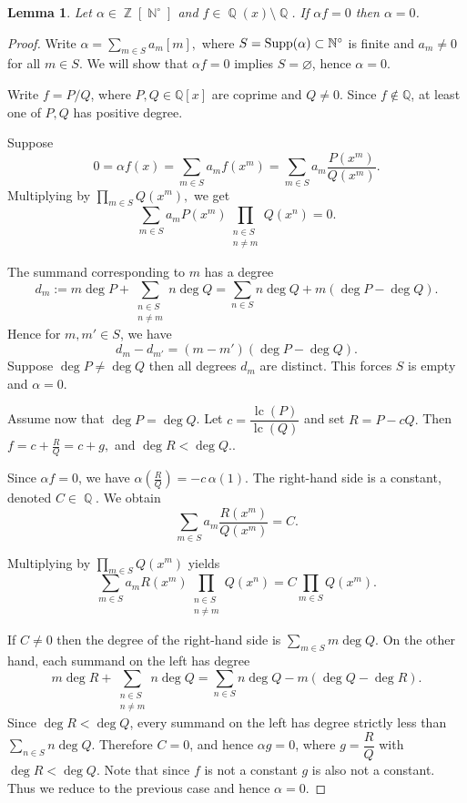 \documentclass[12t,a4paper]{amsart}
\newtheorem{lem}[thm]{Lemma}
\theoremstyle{definition}
\DeclareMathOperator{\Z}{\mathbb{Z}}
\DeclareMathOperator{\N}{\mathbb{N}}
\DeclareMathOperator{\Q}{\mathbb{Q}}
\DeclareMathOperator{\supp}{{\rm Supp}}
\numberwithin{equation}{section}
\begin{document}
{\begin{lem} Let $\alpha\in \Z[\N^\circ]$ and $f\in \Q(x)\setminus \Q$. If $\alpha f=0$ then  $\alpha=0$.
    
\end{lem}
\begin{proof}
 Write
\( 
\alpha=\sum_{m\in S} a_m[m],
\)
where \(S=\supp(\alpha)\subset \mathbb N^\circ\) is finite and \(a_m\neq 0\) for all \(m\in S\).
We will show that \(\alpha f=0\) implies \(S=\varnothing\), hence \(\alpha=0\).

Write \(f=P/Q\), where \(P,Q\in \mathbb Q[x]\) are coprime and \(Q\neq 0\). Since \(f\notin \mathbb Q\), at least one of \(P,Q\) has positive degree. 

Suppose
\[
0=\alpha f(x)=\sum_{m\in S} a_m f(x^m)=\sum_{m\in S} a_m \frac{P(x^m)}{Q(x^m)}.
\]
Multiplying by
\( 
\prod\limits_{m\in S} Q(x^m),
\)
we get
\[
\sum_{m\in S}
a_m P(x^m)\prod_{\substack{n\in S\\ n\neq m}} Q(x^n)=0.
\]

 The summand corresponding to  \(m\) has a degree
\[
d_m:=m\deg P+\sum_{\substack{n\in S\\ n\neq m}} n\deg Q =\sum_{n\in S} n\deg Q + m(\deg P-\deg Q).
\]
Hence for $m,m'\in S$, we have
\[
d_m-d_{m'}=(m-m')(\deg P-\deg Q). 
\]
Suppose $\deg P\not=\deg Q$ then all  degrees $d_m$ are distinct. This forces $S$ is empty and $\alpha=0$.

 Assume now that \(\deg P=\deg Q\). Let
\(
c=\dfrac{\operatorname{lc}(P)}{\operatorname{lc}(Q)}
\)
and set
\(
R=P-cQ.
\) 
Then
\(
f=c+\frac{R}{Q}=c+g,
\)
and
\(
\deg R<\deg Q.
\).

Since \(\alpha f=0\), we have
\( 
\alpha\!\left(\frac{R}{Q}\right)
=
-c\,\alpha(1).
\)
The right-hand side is a constant, denoted $C\in \Q$. We obtain
\[
\sum_{m\in S} a_m \frac{R(x^m)}{Q(x^m)}=C.
\]


Multiplying by \(\prod_{m\in S}Q(x^m)\) yields
\[
\sum_{m\in S}
a_m R(x^m)
\prod_{\substack{n\in S\\ n\neq m}}
Q(x^n)
=
C\prod_{m\in S}Q(x^m).
\]

If $C\not=0$ then the degree of the right-hand side is
\(
\sum\limits_{m\in S} m\deg Q.
\)
On the other hand, each summand on the left has degree
\[
m\deg R+
\sum_{\substack{n\in S\\ n\neq m}}
n\deg Q
=
\sum_{n\in S} n\deg Q
-
m(\deg Q-\deg R).
\]
Since \(\deg R<\deg Q\), every summand on the left has degree strictly less than
\(\sum_{n\in S} n\deg Q\). Therefore \(C=0\), and hence
\(
\alpha g=0
\), where $g=\dfrac{R}{Q}$ with \(\deg R<\deg Q\). Note that  since $f$ is not a constant $g$ is also not a constant.
Thus we reduce to the previous case and hence  $\alpha=0$.
\end{proof}

}
\end{document}
